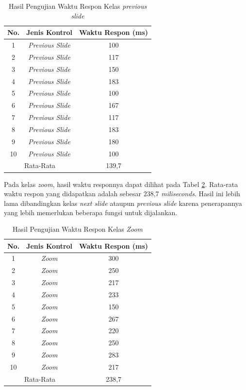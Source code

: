 \begin{longtable}{|c|c|c|}
  \caption{Hasil Pengujian Waktu Respon Kelas \emph{previous slide}}
  \label{tb:Hasil Pengujian Waktu Respon Kelas Previous Slide}\\
  \hline
  \endhead
  No. & Jenis Kontrol & Waktu Respon (ms) \\
  \hline
  1 & \emph{Previous Slide} & 100 \\
  2 & \emph{Previous Slide} & 117 \\
  3 & \emph{Previous Slide} & 150 \\
  4 & \emph{Previous Slide} & 183 \\
  5 & \emph{Previous Slide} & 100 \\
  6 & \emph{Previous Slide} & 167 \\
  7 & \emph{Previous Slide} & 117 \\
  8 & \emph{Previous Slide} & 183 \\
  9 & \emph{Previous Slide} & 180 \\
  10 & \emph{Previous Slide} & 100 \\
  \hline
  \multicolumn{2}{|c|}{Rata-Rata} & 139,7 \\
  \hline
\end{longtable}

Pada kelas \emph{zoom}, hasil waktu responnya dapat dilihat pada Tabel \ref{tb:Hasil Pengujian Waktu Respon Kelas Zoom Slide}. Rata-rata waktu respon yang didapatkan adalah sebesar 238,7 \emph{miliseconds}. Hasil ini lebih lama dibandingkan kelas \emph{next slide} ataupun \emph{previous slide} karena penerapannya yang lebih memerlukan beberapa fungsi untuk dijalankan.

\begin{longtable}{|c|c|c|}
  \caption{Hasil Pengujian Waktu Respon Kelas \emph{Zoom}}
  \label{tb:Hasil Pengujian Waktu Respon Kelas Zoom Slide}\\
  \hline
  \rowcolor[HTML]{FFFFFF}
  \textbf{No.} & \textbf{Jenis Kontrol} & \textbf{Waktu Respon (ms)} \\
  \hline
  1 & \emph{Zoom} & 300 \\
  2 & \emph{Zoom} & 250 \\
  3 & \emph{Zoom} & 217 \\
  4 & \emph{Zoom} & 233 \\
  5 & \emph{Zoom} & 150 \\
  6 & \emph{Zoom} & 267 \\
  7 & \emph{Zoom} & 220 \\
  8 & \emph{Zoom} & 250 \\
  9 & \emph{Zoom} & 283 \\
  10 & \emph{Zoom} & 217 \\
  \hline
  \multicolumn{2}{|c|}{Rata-Rata} & 238,7 \\
  \hline
\end{longtable}

